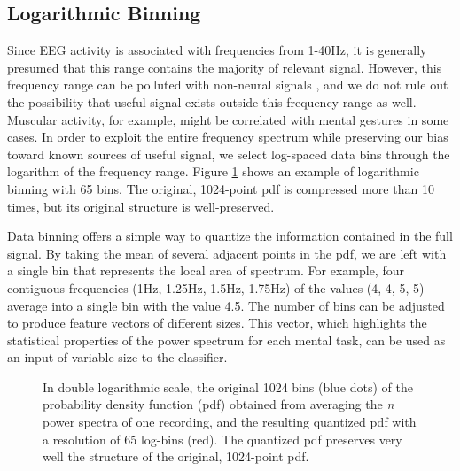 \subsection{Logarithmic Binning}

Since EEG activity is associated with frequencies from 1-40Hz, it is generally presumed that this range contains the majority of relevant signal. However, this frequency range can be polluted with non-neural signals \cite{ball2009signal}, and we do not rule out the possibility that useful signal exists outside this frequency range as well. Muscular activity, for example, might be correlated with mental gestures in some cases. In order to exploit the entire frequency spectrum while preserving our bias toward known sources of useful signal, we select log-spaced data bins through the logarithm of the frequency range. Figure \ref{binnedEEGpowerspec} shows an example of logarithmic binning with 65 bins. The original, 1024-point pdf is compressed more than 10 times, but its original structure is well-preserved.

Data binning offers a simple way to quantize the information contained in the full signal. By taking the mean of several adjacent points in the pdf, we are left with a single bin that represents the local area of spectrum. For example, four contiguous frequencies (1Hz, 1.25Hz, 1.5Hz, 1.75Hz) of the values (4, 4, 5, 5) average into a single bin with the value 4.5. The number of bins can be adjusted to produce feature vectors of different sizes. This vector, which highlights the statistical properties of the power spectrum for each mental task, can be used as an input of variable size to the classifier.

\begin{figure}[!h]
  \vspace{-0.2cm}
  \centering
  {}
\caption{In double logarithmic scale, the original 1024 bins (blue dots) of the probability density function (pdf) obtained from averaging the \emph{n} power spectra of one recording, and the resulting quantized pdf with a resolution of 65 log-bins (red). The quantized pdf preserves very well the structure of the original, 1024-point pdf. }
\label{binnedEEGpowerspec}
\vspace{-0.1cm}
\end{figure}



